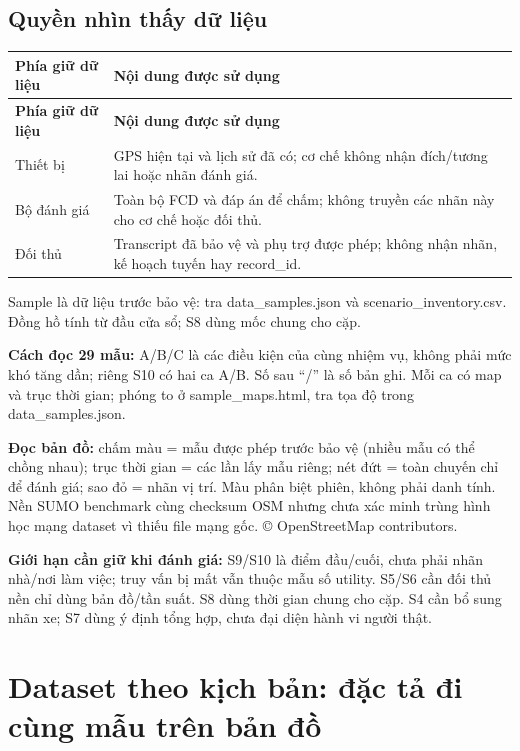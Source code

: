 \documentclass[10pt,a4paper]{article}
\begin{document}
\subsection{Quyền nhìn thấy dữ liệu}
\begingroup\small
\begin{longtable}{@{}P{3.904cm}P{13.014cm}@{}}
\toprule
\textbf{Phía giữ dữ liệu} & \textbf{Nội dung được sử dụng}\\\midrule
\endfirsthead
\toprule
\textbf{Phía giữ dữ liệu} & \textbf{Nội dung được sử dụng}\\\midrule
\endhead
\bottomrule\endfoot
Thiết bị & GPS hiện tại và lịch sử đã có; cơ chế không nhận đích/tương lai hoặc nhãn đánh giá.\\
\addlinespace[3pt]
Bộ đánh giá & Toàn bộ FCD và đáp án để chấm; không truyền các nhãn này cho cơ chế hoặc đối thủ.\\
\addlinespace[3pt]
Đối thủ & Transcript đã bảo vệ và phụ trợ được phép; không nhận nhãn, kế hoạch tuyến hay record\_\allowbreak{}id.\\
\end{longtable}
\endgroup
Sample là dữ liệu trước bảo vệ: tra data\_\allowbreak{}samples.json và scenario\_\allowbreak{}inventory.csv. Đồng hồ tính từ đầu cửa sổ; S8 dùng mốc chung cho cặp.

\textbf{Cách đọc 29 mẫu:} A/B/C là các điều kiện của cùng nhiệm vụ, không phải mức khó tăng dần; riêng S10 có hai ca A/B. Số sau “/” là số bản ghi. Mỗi ca có map và trục thời gian; phóng to ở sample\_\allowbreak{}maps.html, tra tọa độ trong data\_\allowbreak{}samples.json.

\textbf{Đọc bản đồ:} chấm màu = mẫu được phép trước bảo vệ (nhiều mẫu có thể chồng nhau); trục thời gian = các lần lấy mẫu riêng; nét đứt = toàn chuyến chỉ để đánh giá; sao đỏ = nhãn vị trí. Màu phân biệt phiên, không phải danh tính. Nền SUMO benchmark cùng checksum OSM nhưng chưa xác minh trùng hình học mạng dataset vì thiếu file mạng gốc. © OpenStreetMap contributors.

\textbf{Giới hạn cần giữ khi đánh giá:} S9/S10 là điểm đầu/cuối, chưa phải nhãn nhà/nơi làm việc; truy vấn bị mất vẫn thuộc mẫu số utility. S5/S6 cần đối thủ nền chỉ dùng bản đồ/tần suất. S8 dùng thời gian chung cho cặp. S4 cần bổ sung nhãn xe; S7 dùng ý định tổng hợp, chưa đại diện hành vi người thật.


\clearpage
\section{Dataset theo kịch bản: đặc tả đi cùng mẫu trên bản đồ}
\end{document}
